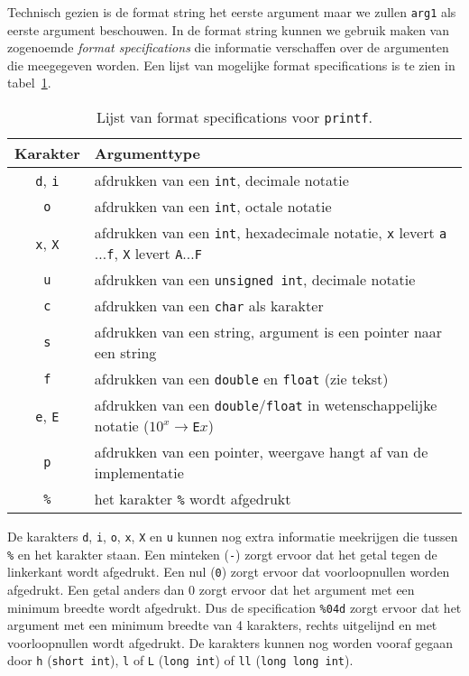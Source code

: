 Technisch gezien is de format string het eerste argument maar we zullen \texttt{arg1} als eerste argument beschouwen. In de format string kunnen we gebruik maken van zogenoemde \textsl{format specifications} die informatie verschaffen over de argumenten die meegegeven worden. Een lijst van mogelijke format specifications is te zien in tabel~\ref{tab:invprintf}.

\begin{table}[!ht]
\centering
\caption{Lijst van format specifications voor \texttt{printf}.}
\label{tab:invprintf}
\begin{tabular}{@{}cl@{}}
\toprule
Karakter & Argumenttype \\
\midrule 
\texttt{d}, \texttt{i} & afdrukken van een \texttt{int}, decimale notatie\\
\texttt{o} & afdrukken van een \texttt{int}, octale notatie\\
\texttt{x}, \texttt{X} & afdrukken van een \texttt{int}, hexadecimale notatie, \texttt{x} levert \texttt{a$\ldots$f}, \texttt{X} levert \texttt{A$\ldots$F}\\
\texttt{u} & afdrukken van een \texttt{unsigned int}, decimale notatie\\
\texttt{c} & afdrukken van een \texttt{char} als karakter\\
\texttt{s} & afdrukken van een string, argument is een pointer naar een string\\
\texttt{f} & afdrukken van een \texttt{double} en \texttt{float} (zie tekst)\\
\texttt{e}, \texttt{E} & afdrukken van een \texttt{double}/\texttt{float} in wetenschappelijke notatie ($10^x\!\rightarrow$\texttt{E}$x$)\\
\texttt{p} & afdrukken van een pointer, weergave hangt af van de implementatie\\
\texttt{\%} & het karakter \texttt{\%} wordt afgedrukt\\
\bottomrule
\end{tabular}
\end{table}

De karakters \texttt{d}, \texttt{i}, \texttt{o}, \texttt{x}, \texttt{X} en \texttt{u} kunnen nog extra informatie meekrijgen die tussen \texttt{\%} en het karakter staan. Een minteken (\texttt{-}) zorgt ervoor dat het getal tegen de linkerkant wordt afgedrukt. Een nul (\texttt{0}) zorgt ervoor dat voorloopnullen worden afgedrukt. Een getal anders dan 0 zorgt ervoor dat het argument met een minimum breedte wordt afgedrukt. Dus de specification \texttt{\%04d} zorgt ervoor dat het argument met een minimum breedte van 4 karakters, rechts uitgelijnd en met voorloopnullen wordt afgedrukt. De karakters kunnen nog worden vooraf gegaan door \texttt{h} (\texttt{short int}), \texttt{l} of \texttt{L} (\texttt{long int}) of \texttt{ll} (\texttt{long long int}).

